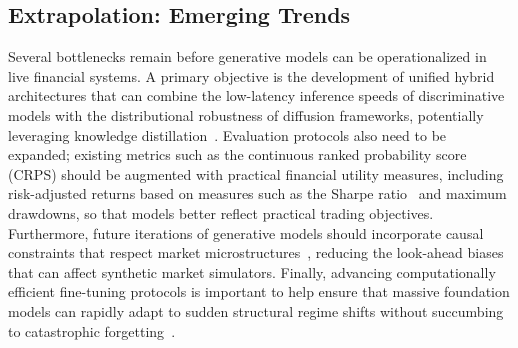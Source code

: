 \subsection{Extrapolation: Emerging Trends}
Several bottlenecks remain before generative models can be operationalized in live financial systems. A primary objective is the development of unified hybrid architectures that can combine the low-latency inference speeds of discriminative models with the distributional robustness of diffusion frameworks, potentially leveraging knowledge distillation~\citep{hinton2015distilling}. Evaluation protocols also need to be expanded; existing metrics such as the continuous ranked probability score (CRPS) should be augmented with practical financial utility measures, including risk-adjusted returns based on measures such as the Sharpe ratio~\citep{sharpe1994sharpe} and maximum drawdowns, so that models better reflect practical trading objectives. Furthermore, future iterations of generative models should incorporate causal constraints that respect market microstructures~\citep{ohara1995market,gould2013limit}, reducing the look-ahead biases that can affect synthetic market simulators. Finally, advancing computationally efficient fine-tuning protocols is important to help ensure that massive foundation models can rapidly adapt to sudden structural regime shifts without succumbing to catastrophic forgetting~\citep{mccloskey1989catastrophic,zenke2017continual}.

